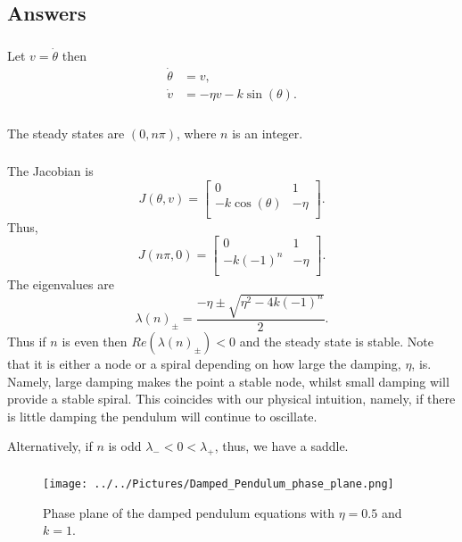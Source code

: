 \documentclass[]{article}
\newcommand{\bb}{\begin{equation}}
\newcommand{\ee}{\end{equation}}
\newcommand{\tbo}{.6\textwidth}
\begin{document}
\begin{Answ}
\subsection{Answers}
\subsubsection{}
Let $v=\dot{\theta}$ then
\begin{align}
\dot{\theta}&=v,\\
\dot{v}&=-\eta v-k\sin(\theta).
\end{align}

\subsubsection{}
The steady states are $(0,n\pi)$, where $n$ is an integer.
\subsubsection{}
The Jacobian is
\bb
J(\theta,v)=\left[ {\begin{array}{cc}
   0&1 \\
  -k\cos(\theta) & -\eta \\
  \end{array} } \right].
\ee
Thus,
\bb
J(n\pi,0)=\left[ {\begin{array}{cc}
   0&1 \\
  -k(-1)^n & -\eta \\
  \end{array} } \right].
\ee
The eigenvalues are
\bb
\lambda(n)_\pm=\frac{-\eta\pm\sqrt{\eta^2-4k(-1)^n}}{2}.
\ee
Thus if $n$ is even then $Re(\lambda(n)_\pm)<0$ and the steady state is stable. Note that it is either a node or a spiral depending on how large the damping, $\eta$, is. Namely, large damping makes the point a stable node, whilst small damping will provide a stable spiral. This coincides with our physical intuition, namely, if there is little damping the pendulum will continue to oscillate.

Alternatively, if $n$ is odd $\lambda_-<0<\lambda_+$, thus, we have a saddle.
\subsubsection{}
\begin{figure}[h!!!tb]
\centering
\texttt{[image: ../../Pictures/Damped\_Pendulum\_phase\_plane.png]}
\caption{Phase plane of the damped pendulum equations with $\eta=0.5$ and $k=1$.\label{Damped_fig}}
\end{figure}
\end{Answ}
\end{document}
